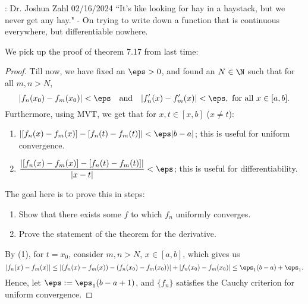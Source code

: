 \begin{nquote}{: Dr. Joshua Zahl 02/16/2024}
	``It's like looking for hay in a haystack, but we never get any hay." - On trying to write down a function that is continuous everywhere, but differentiable nowhere.
\end{nquote}

We pick up the proof of theorem 7.17 from last time:
\begin{proof}
	Till now, we have fixed an \(\eps>0\), and found an \(N\in\N\) such that for all \(m,n>N\), 
	\begin{equation*}
		|f_n(x_0)-f_m(x_0)|<\eps\quad\text{and}\quad |f'_n(x)-f'_m(x)|<\eps,~\text{for all}~x\in[a,b].
	\end{equation*}
	Furthermore, using MVT, we get that for \(x,t\in[x,b]\) (\(x\neq t\)):
	\begin{enumerate}
		\item \(|[f_n(x)-f_m(x)]-[f_n(t)-f_m(t)]|<\eps|b-a|\); this is useful for uniform convergence.
		
		\item \(\displaystyle\frac{|[f_n(x)-f_m(x)]-[f_n(t)-f_m(t)]|}{|x-t|}<\eps\); this is useful for differentiability.
	\end{enumerate}
	The goal here is to prove this in steps:
	\begin{enumerate}
		\item Show that there exists some \(f\) to which \(f_n\) uniformly converges.
		
		\item Prove the statement of the theorem for the derivative.
	\end{enumerate}
	By (1), for \(t=x_0\), consider \(m,n>N\), \(x\in[a,b]\), which gives us 
	\begin{equation*}
		|f_n(x)-f_m(x)|\leq |(f_n(x)-f_m(x))-(f_n(x_0)-f_m(x_0))|+|f_n(x_0)-f_m(x_0)|\leq \eps_1(b-a)+\eps_1.
	\end{equation*}
	Hence, let \(\eps:=\eps_1(b-a+1)\), and \(\{f_n\}\) satisfies the Cauchy criterion for uniform convergence.
	
	\medskip
	

\end{proof}
